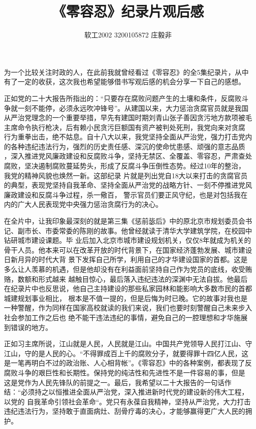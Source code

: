 \documentclass[utf8,a4paper,20pt]{article}
\title{{\huge {《零容忍》纪录片观后感}}}
\author{{\Large{软工2002 3200105872 庄毅非}}}
\date{}
\begin{document}
\maketitle
\large
\par 
    为一个比较关注时政的人，在此前我就曾经看过《零容忍》的全5集纪录片，从中有了一定的收获，这次我也希望能够借书写观后感的机会分享一下自己的感想。
\par 
    正如党的二十大报告所指出的：“只要存在腐败问题产生的土壤和条件，反腐败斗争就一刻不能停，必须永远吹冲锋号”。从建国以来，大力惩治贪腐官员就是我国
    从严治党理念的一个重要举措，早先有建国时期刘青山张子善因贪污地方款项被毛主席命令执行枪决，后有赖小民贪污巨额国有资产被判处死刑，我党向来对贪腐
    行为重拳出击，绝不姑息。自十八大以来，我党坚持全面从严治党，强力打击党内的各种违纪违法行为，强烈的历史责任感、深沉的使命忧患感、顽强的意志品质
    ，深入推进党风廉政建设和反腐败斗争，坚持无禁区、全覆盖、零容忍，严肃查处腐败，坚决遏制腐败蔓延势头，形成了反腐斗争压倒性态势。经过10年的整治，
    我党的精神风貌也焕然一新。这部纪录
    片就是列出党自18大以来打击的贪腐官员的典型，表现党坚持自我革命、坚持全面从严治党的战略方针、一刻不停推进党风廉政建设和反腐斗争过程，杀一儆百，
    警示官员们要正风守纪，也是对包括我在内的广大人民表现党中央强力惩治贪腐行为的决心。
\par 
    在全片中，让我印象最深刻的就是第三集《惩前毖后》中的原北京市规划委员会书记、副市长、市委常委的陈刚的故事。他曾经就读于清华大学建筑学院，在校园中钻研城市建设课题。毕
    业后加入北京市城市建设规划机关，仅仅8年就成为机关的骨干人员。他本来可以在改革开放的时代背景下，在国家经济蓬勃发展、城市建设日新月异的时代大背
    景下发挥自己所学，利用自己的才华建设国家的首都。这是多么让人羡慕的机遇，但是他却没有在利益面前坚持自己作为党员的底线，收受贿赂，数额和形式越来
    越触目惊心，最后落入违纪违法的深渊中无法自拔。他最后在纪录片中也反思说，他自己主持建设的那些私家园林和能影响大多数市民的首都城建规划事业相比，
    根本是不值一提的，但是后悔为时已晚。它的故事对我也是一种警醒，作为同样在国家高校就读的我们来说，我们也要时刻警醒自己未来步入社会参加工作之后也
    绝不能干违法违纪的事情，避免自己的一腔理想和才华施展到错误的地方。
\par 
    正如习主席所说，江山就是人民，人民就是江山。中国共产党领导人民打江山、守江山，守的是人民的心。“不得罪成百上千的腐败分子，就要得罪十四亿人民，这
    是一笔再明白不过的政治账、人心相背帐”。《零容忍》中的各种案例，都表现了反腐败斗争的艰巨性和长期性。保持党的纯洁性和先进性不是一件容易的事，但是
    这是党作为人民先锋队的前提之一。最后，我希望以二十大报告的一句话作结：“必须持之以恒推进全面从严治党，深入推进新时代党的建设新的伟大工程，以党的
    自我革命引领社会革命“。党只有永葆自我精神，坚持从严治党，大力打击违纪违法行为，坚持敢于直面病灶、刮骨疗毒的决心，才能够赢得更广大人民的拥护。
    
\end{document}
